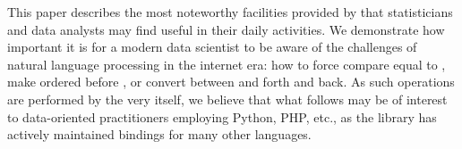 \documentclass[nojss]{jss}\usepackage[]{graphicx}\usepackage[]{color}
\begin{document}

\bigskip
This paper describes
the most noteworthy facilities provided by 
that statisticians and data analysts may find useful in their daily activities.
We demonstrate how important it is for a modern data scientist
to be aware of the challenges
of natural language processing in the internet era:
how to force  compare equal to ,
make  ordered before , or
convert between  and  forth and back.
As such operations are performed by the very  itself,
we believe that what follows may be of interest
to data-oriented practitioners employing Python, PHP, etc.,
as the library has actively maintained bindings for many other languages.

\end{document}
